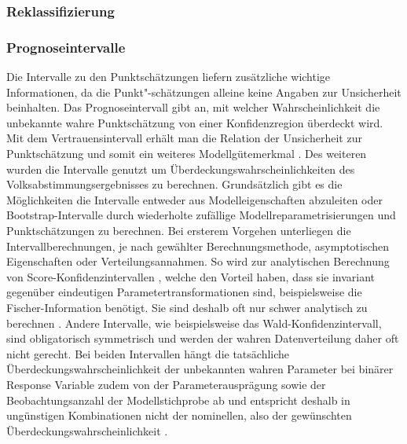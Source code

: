 \documentclass{Vorlage}
\begin{document}
\subsubsection{Reklassifizierung}


\subsubsection{Prognoseintervalle}

Die Intervalle zu den Punktschätzungen liefern zusätzliche wichtige Informationen, da die Punkt"-schätzungen alleine keine Angaben zur Unsicherheit beinhalten. Das Prognoseintervall gibt an, mit welcher Wahrscheinlichkeit die unbekannte wahre Punktschätzung von einer Konfidenzregion überdeckt wird. Mit dem Vertrauensintervall erhält man die Relation der Unsicherheit zur Punktschätzung und somit ein weiteres Modellgütemerkmal \cite[p. 471]{fahrmeir2013regression}. Des weiteren wurden die Intervalle genutzt um Überdeckungswahrscheinlichkeiten des Volksabstimmungsergebnisses \cite{Amt} zu berechnen. Grundsätzlich gibt es die Möglichkeiten die Intervalle entweder aus Modelleigenschaften abzuleiten oder Bootstrap-Intervalle durch wiederholte zufällige Modellreparametrisierungen und Punktschätzungen zu berechnen. Bei ersterem Vorgehen unterliegen die Intervallberechnungen, je nach gewählter Berechnungsmethode, asymptotischen Eigenschaften oder Verteilungsannahmen. So wird zur analytischen Berechnung von Score-Konfidenzintervallen \cite[p. 64 ff.]{held2008}, welche den Vorteil haben, dass sie invariant gegenüber eindeutigen Parametertransformationen sind, beispielsweise die Fischer-Information benötigt. Sie sind deshalb oft nur schwer analytisch zu berechnen \cite[p. 74]{held2008}. Andere Intervalle, wie beispielsweise das Wald-Konfidenzintervall, sind obligatorisch symmetrisch \cite[p. 60]{held2008} und werden der wahren Datenverteilung daher oft nicht gerecht. Bei beiden Intervallen hängt die tatsächliche Überdeckungswahrscheinlichkeit der unbekannten wahren Parameter bei binärer Response Variable zudem von der Parameterausprägung sowie der Beobachtungsanzahl der Modellstichprobe ab und entspricht deshalb in ungünstigen Kombinationen nicht der nominellen, also der gewünschten Überdeckungswahrscheinlichkeit \cite{Int}. 
\end{document}
